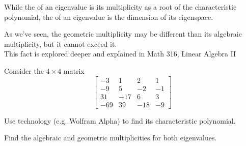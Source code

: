 \begin{applicationActivities}
\begin{definition}
While the  of an eigenvalue is its multiplicity as
a root of the characteristic polynomial,
the  of an eigenvalue is the dimension of its
eigenspace.
\end{definition}

\begin{fact}
  As we've seen, the geometric multiplicity may be different than
  its algebraic multiplicity, but it cannot exceed it.
  \ \\
  This fact is explored deeper and explained in Math 316, Linear Algebra II
  \end{fact}


\begin{activity}{20}
  Consider the \(4\times 4\) matrix
  \[
    \begin{bmatrix}
      -3 & 1 & 2 & 1 \\
      -9 & 5 & -2 & -1 \\
      31 & -17 & 6 & 3 \\
      -69 & 39 & -18 & -9
    \end{bmatrix}
  \]
  \begin{subactivity}
    Use technology (e.g. Wolfram Alpha) to find its characteristic polynomial.
  \end{subactivity}
  \begin{subactivity}
    Find the algebraic and geometric multiplicities for both eigenvalues.
  \end{subactivity}
\end{activity}



\end{applicationActivities}
